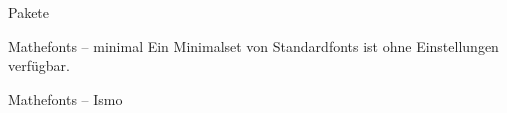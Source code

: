\begin{frame}[fragile]{Pakete}
  \begin{lstverbatim}
  \usepackage{amsmath}      %
  \usepackage{amssymb}      %
  \usepackage{mathtools}    %

  \usepackage{fontspec}     %

  \usepackage[
    math-style=ISO,         %
    bold-style=ISO,         %
    sans-style=italic,      %
    nabla=upright,          %
    partial=upright,        %
    vargreek-shape=unicode, %
  ]{unicode-math}           %
  \end{lstverbatim}
\end{frame}

\begin{frame}[fragile]{Mathefonts – minimal}
  Ein Minimalset von Standardfonts ist ohne Einstellungen verfügbar.
\end{frame}

\begin{frame}[fragile]{Mathefonts – Ismo}
  \fontsize{9}{7}
  \begin{lstverbatim}


  \protected{}


  \let\hbar\relax
  \DeclareMathSymbol{\hbar}{\mathord}{AMSb}{"7E}
  \end{lstverbatim}
\end{frame}


